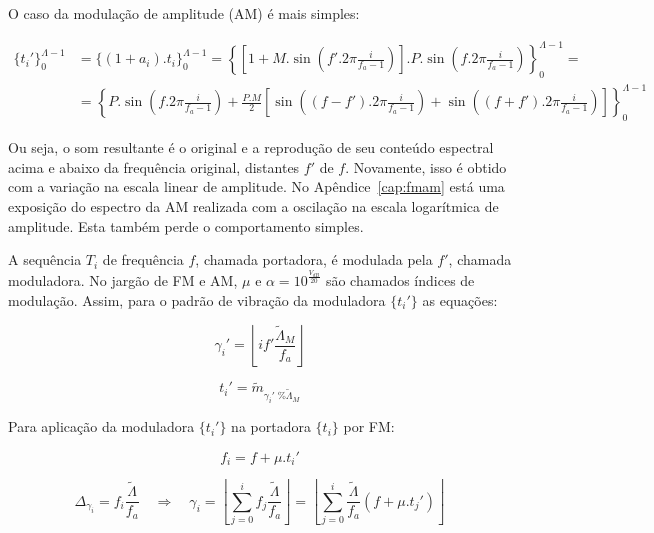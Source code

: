 O caso da modulação de amplitude (AM) é mais simples:

\begin{equation}\label{eq:amEsp}
\begin{split}
\{t_i'\}_0^{\Lambda-1} & =\{(1+a_i) . t_i\}_0^{\Lambda-1}= \left \{ \left [ 1+M.\sin \left ( f'.2\pi\frac{i}{f_a -1} \right ) \right] . P .\sin \left ( f.2\pi\frac{i}{f_a -1} \right ) \right \}_0^{\Lambda-1} = \\
                       & =  \left\{P.\sin \left( f.2\pi\frac{i}{f_a -1}  \right ) + \frac{P.M}{2} \left [ \sin \left( (f-f').2\pi\frac{i}{f_a -1}  \right ) + \sin \left( (f+f').2\pi\frac{i}{f_a -1}  \right ) \right ] \right \}_0^{\Lambda-1}
\end{split}
\end{equation}

Ou seja, o som resultante é o original
e a reprodução de seu conteúdo espectral acima e abaixo da frequência
original, distantes $f'$ de $f$. Novamente, isso é obtido com a variação na escala linear de amplitude. No Apêndice~\ref{cap:fmam} está uma exposição do espectro da AM realizada com a oscilação na escala logarítmica de amplitude. Esta também perde o comportamento simples.

A sequência $T_i$ de frequência $f$, chamada portadora, é modulada pela $f'$, chamada moduladora. No jargão de FM e AM, $\mu$ e $\alpha=10^{\frac{V_{dB}}{20}}$ são chamados índices de modulação. Assim, 
para o padrão de vibração da moduladora $\{t_i'\}$ as equações:

\begin{equation}\label{fmGammaAux}
\gamma_i'=\left \lfloor i f' \frac{\widetilde{\Lambda}_M}{f_a} \right \rfloor
\end{equation}

\begin{equation}\label{fmAux}
t_i'=\widetilde{m}_{\gamma_i' \;\% \widetilde{\Lambda}_M}
\end{equation}

Para aplicação da moduladora $\{t_i'\}$ na portadora $\{t_i\}$
por FM:

\begin{equation}\label{fmF}
f_i=f + \mu . t_i'
\end{equation}

\begin{equation}\label{fmGamma}
\Delta_{\gamma_i}=f_i\frac{\widetilde{\Lambda}}{f_a} \quad \Rightarrow \quad \gamma_i = \left \lfloor \sum_{j=0}^{i} f_j \frac{\widetilde{\Lambda}}{f_a} \right \rfloor = \left \lfloor \sum_{j=0}^{i} \frac{\widetilde{\Lambda}}{f_a}(f+\mu . t_j') \right\rfloor
\end{equation}

